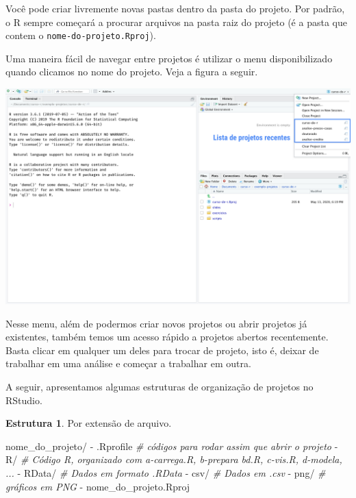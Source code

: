 \documentclass[
]{book}
\newenvironment{Shaded}{\begin{snugshade}}{\end{snugshade}}
\newcommand{\CommentTok}[1]{\textcolor[rgb]{0.56,0.35,0.01}{\textit{#1}}}
\newcommand{\ExtensionTok}[1]{#1}
\newcommand{\NormalTok}[1]{#1}
\begin{document}
Você pode criar livremente novas pastas dentro da pasta do projeto. Por padrão, o R sempre começará a procurar arquivos na pasta raiz do projeto (é a pasta que contem o \texttt{nome-do-projeto.Rproj}).

Uma maneira fácil de navegar entre projetos é utilizar o menu disponibilizado quando clicamos no nome do projeto. Veja a figura a seguir.

\begin{center}\includegraphics[width=40in]{assets/img/rstudio/exemplo-lista-projetos} \end{center}

Nesse menu, além de podermos criar novos projetos ou abrir projetos já existentes, também temos um acesso rápido a projetos abertos recentemente. Basta clicar em qualquer um deles para trocar de projeto, isto é, deixar de trabalhar em uma análise e começar a trabalhar em outra.

A seguir, apresentamos algumas estruturas de organização de projetos no RStudio.

\textbf{Estrutura 1}. Por extensão de arquivo.

\begin{Shaded}
\begin{Highlighting}[]
\ExtensionTok{nome\_do\_projeto/}
  \ExtensionTok{{-}}\NormalTok{ .Rprofile   }\CommentTok{\# códigos para rodar assim que abrir o projeto}
  \ExtensionTok{{-}}\NormalTok{ R/          }\CommentTok{\# Código R, organizado com a{-}carrega.R, b{-}prepara bd.R, c{-}vis.R, d{-}modela, ...}
  \ExtensionTok{{-}}\NormalTok{ RData/      }\CommentTok{\# Dados em formato .RData}
  \ExtensionTok{{-}}\NormalTok{ csv/        }\CommentTok{\# Dados em .csv}
  \ExtensionTok{{-}}\NormalTok{ png/        }\CommentTok{\# gráficos em PNG}
  \ExtensionTok{{-}}\NormalTok{ nome\_do\_projeto.Rproj}
\end{Highlighting}
\end{Shaded}
\end{document}
